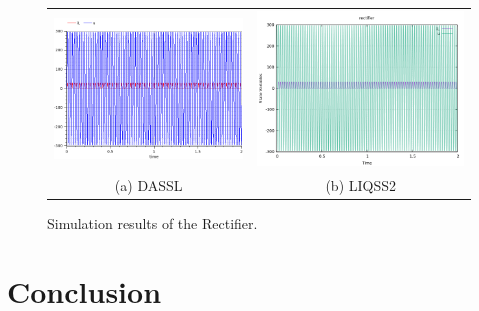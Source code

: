 \documentclass[10pt]{article}
\begin{document}
    \begin{figure}[htbp]\centering
		\begin{tabular}{cc}

   \includegraphics[scale=0.45]{./Fig/rec-om.png}&\includegraphics[scale=0.45]{./Fig/rec-liqss.png}\\(a) DASSL&(b) LIQSS2
    \end{tabular}
\vspace{-0.2cm}
\caption{Simulation results of the Rectifier.}\label{Fig1}
\end{figure}

\newpage



\section{Conclusion}
\end{document}

